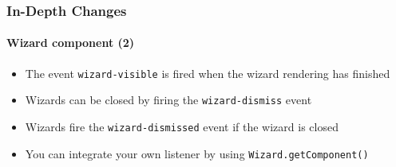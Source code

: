 \begin{frame}[fragile]
	\frametitle{In-Depth Changes}
	\framesubtitle{Wizard component (2)}

	\lstset{basicstyle=\tiny\ttfamily}

	\begin{itemize}

		\item The event \texttt{wizard-visible} is fired when the wizard rendering has finished

		\item Wizards can be closed by firing the \texttt{wizard-dismiss} event

		\item Wizards fire the \texttt{wizard-dismissed} event if the wizard is closed

		\item You can integrate your own listener by using \texttt{Wizard.getComponent()}

	\end{itemize}

\end{frame}

